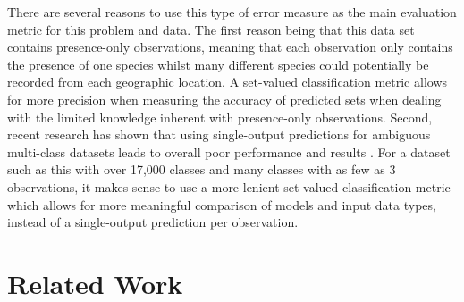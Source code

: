 \documentclass[12pt, oneside]{article}
\begin{document}
\begin{normalsize}
There are several reasons to use this type of error measure as the main evaluation metric for this problem and data. The first reason being that this data set contains presence-only observations, meaning that each observation only contains the presence of one species whilst many different species could potentially be recorded from each geographic location. A set-valued classification metric allows for more precision when measuring the accuracy of predicted sets when dealing with the limited knowledge inherent with presence-only observations. Second, recent research has shown that using single-output predictions for ambiguous multi-class datasets leads to overall poor performance and results \cite{chzhen2021set}. For a dataset such as this with over 17,000 classes and many classes with as few as 3 observations, it makes sense to use a more lenient set-valued classification metric which allows for more meaningful comparison of models and input data types, instead of a single-output prediction per observation.

\end{normalsize}

\section{Related Work}
\label{Related Work}
\end{document}
